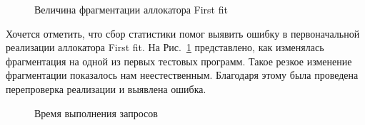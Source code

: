    \begin{figure}[p]
   \caption{Величина фрагментации аллокатора First fit}
   \label{ris:image4}
   \end{figure}
   
    Хочется отметить, что сбор статистики помог выявить ошибку в первоначальной реализации аллокатора First fit. На Рис.~\ref{ris:image4} 
представлено, как изменялась фрагментация на одной из первых тестовых программ. Такое резкое изменение фрагментации показалось нам 
неестественным. Благодаря этому была проведена перепроверка реализации и выявлена ошибка.
   
   \begin{figure}[p]
   \caption{Время выполнения запросов}
   \label{ris:image5}
   \end{figure}
   

